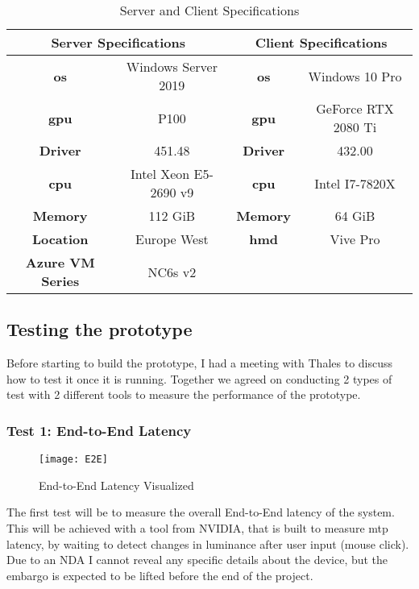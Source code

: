 \begin{table}[h]	
\begin{center}
\caption{Server and Client Specifications}
\begin{tabular}{ |c|c|c|c| } 
\hline
\multicolumn{2}{|c|}{Server Specifications} & \multicolumn{2}{|c|}{Client Specifications}\\ 
\hline\hline
\textbf{\acrshort{os}} & Windows Server 2019  &  \textbf{\acrshort{os}} & Windows 10 Pro\\ 
\hline
\textbf{\acrshort{gpu}} & P100 & \textbf{\acrshort{gpu}} & GeForce RTX 2080 Ti\\ 
\hline
\textbf{Driver} & 451.48 &  \textbf{Driver} & 432.00\\ 
\hline
\textbf{\acrshort{cpu}} & Intel Xeon E5-2690 v9 & \textbf{\acrshort{cpu}} & Intel I7-7820X\\
\hline
\textbf{Memory} & 112 GiB & \textbf{Memory} & 64 GiB\\
\hline
\textbf{Location} & Europe West & \textbf{\acrshort{hmd}} & Vive Pro\\
\hline
\textbf{Azure VM Series} & NC6s v2 & & \\
\hline
\end{tabular}
\end{center}

\end{table}

\subsection{Testing the prototype}
Before starting to build the prototype, I had a meeting with Thales to discuss how to test it once it is running. Together we agreed on conducting 2 types of test with 2 different tools to measure the performance of the prototype.

\subsubsection{Test 1: End-to-End Latency}
\begin{figure}[h!]
\caption{End-to-End Latency Visualized \parencite{e2e}}
\label{fig:e2e}
\texttt{[image: E2E]}
\end{figure}
The first test will be to measure the overall End-to-End latency of the system. This will be achieved with a tool from NVIDIA, that is built to measure \acrshort{mtp} latency, by waiting to detect changes in luminance after user input (mouse click). Due to an NDA I cannot reveal any specific details about the device, but the embargo is expected to be lifted before the end of the project.

